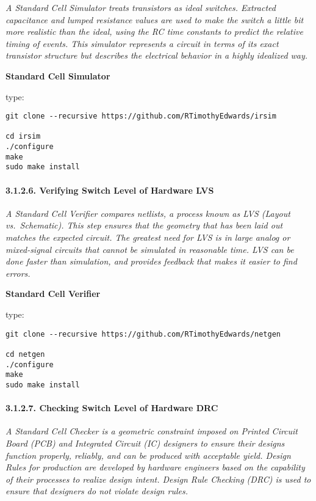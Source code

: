 \documentclass[]{article}
\let\oldparagraph\paragraph
\renewcommand{\paragraph}[1]{\oldparagraph{#1}\mbox{}}
\begin{document}
\emph{A Standard Cell Simulator treats transistors as ideal switches.
Extracted capacitance and lumped resistance values are used to make the
switch a little bit more realistic than the ideal, using the RC time
constants to predict the relative timing of events. This simulator
represents a circuit in terms of its exact transistor structure but
describes the electrical behavior in a highly idealized way.}

\textbf{Standard Cell Simulator}

type:

\begin{verbatim}
git clone --recursive https://github.com/RTimothyEdwards/irsim

cd irsim
./configure
make
sudo make install
\end{verbatim}

\paragraph{3.1.2.6. Verifying Switch Level of Hardware
LVS}\label{verifying-switch-level-of-hardware-lvs}

\emph{A Standard Cell Verifier compares netlists, a process known as LVS
(Layout vs.~Schematic). This step ensures that the geometry that has
been laid out matches the expected circuit. The greatest need for LVS is
in large analog or mixed-signal circuits that cannot be simulated in
reasonable time. LVS can be done faster than simulation, and provides
feedback that makes it easier to find errors.}

\textbf{Standard Cell Verifier}

type:

\begin{verbatim}
git clone --recursive https://github.com/RTimothyEdwards/netgen

cd netgen
./configure
make
sudo make install
\end{verbatim}

\paragraph{3.1.2.7. Checking Switch Level of Hardware
DRC}\label{checking-switch-level-of-hardware-drc}

\emph{A Standard Cell Checker is a geometric constraint imposed on
Printed Circuit Board (PCB) and Integrated Circuit (IC) designers to
ensure their designs function properly, reliably, and can be produced
with acceptable yield. Design Rules for production are developed by
hardware engineers based on the capability of their processes to realize
design intent. Design Rule Checking (DRC) is used to ensure that
designers do not violate design rules.}
\end{document}

